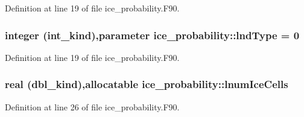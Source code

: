 Definition at line 19 of file ice\_\-probability.F90.\hypertarget{namespaceice__probability_aaabce4689cd62ee3719275cd92df9912}{
\subsubsection[{lndType}]{\setlength{\rightskip}{0pt plus 5cm}integer (int\_\-kind),parameter {\bf ice\_\-probability::lndType} = 0}}
\label{namespaceice__probability_aaabce4689cd62ee3719275cd92df9912}


Definition at line 19 of file ice\_\-probability.F90.\hypertarget{namespaceice__probability_a15428ca096f845ed45a6caddd622c7c8}{
\subsubsection[{lnumIceCells}]{\setlength{\rightskip}{0pt plus 5cm}real (dbl\_\-kind),allocatable {\bf ice\_\-probability::lnumIceCells}}}
\label{namespaceice__probability_a15428ca096f845ed45a6caddd622c7c8}


Definition at line 26 of file ice\_\-probability.F90.